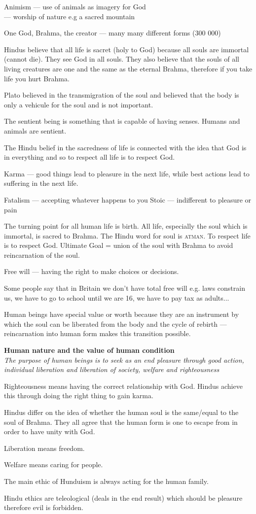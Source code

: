 \documentclass{article}
\begin{document}
Animism --- use of animals as imagery for God\\
	--- worship of nature e.g a sacred mountain

One God, Brahma, the creator --- many many different forms (300 000)

Hindus believe that all life is sacret (holy to God) because all souls are immortal (cannot die).  They see God in all souls.  They also believe that the souls of all living creatures are one and the same as the eternal Brahma, therefore if you take life you hurt Brahma.

Plato believed in the transmigration of the soul and believed that the body is only a vehicule for the soul and is not important.

The sentient being is something that is capable of having senses.  Humans and animals are sentient.

The Hindu belief in the sacredness of life is connected with the idea that God is in everything and so to respect all life is to respect God.

Karma --- good things lead to pleasure in the next life, while best actions lead to suffering in the next life.

Fatalism --- accepting whatever happens to you
Stoic --- indifferent to pleasure or pain

The turning point for all human life is birth.  All life, especially the soul which is immortal, is sacred to Brahma.  The Hindu word for soul is \textsc{atman}.  To respect life is to respect God.  Ultimate Goal = union of the soul with Brahma to avoid reincarnation of the soul.

Free will --- having the right to make choices or decisions.

Some people say that in Britain we don't have total free will e.g. laws constrain us, we have to go to school until we are 16, we have to pay tax as adults...

Human beings have special value or worth because they are an instrument by which the soul can be liberated from the body and the cycle of rebirth --- reincarnation into human form makes this transition possible.


\textbf{Human nature and the value of human condition}\\
\textit{The purpose of human beings is to seek as an end pleasure through good action, individual liberation and liberation of society, welfare and righteousness}

Righteousness means having the correct relationship with God.  Hindus achieve this through doing the right thing to gain karma.

Hindus differ on the idea of whether the human soul is the same/equal to the soul of Brahma.  They all agree that the human form is one to escape from in order to have unity with God.

Liberation means freedom.

Welfare means caring for people.

The main ethic of Hunduism is always acting for the human family.

Hindu ethics are teleological (deals in the end result) which should be pleasure therefore evil is forbidden.
\end{document}
